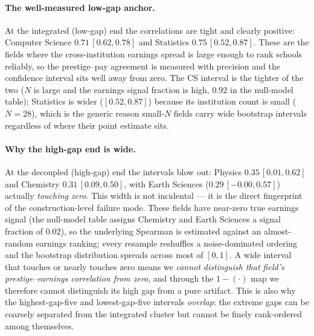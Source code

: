 \documentclass[11pt]{article}
\begin{document}
\paragraph{The well-measured low-gap anchor.}
At the integrated (low-gap) end the correlations are tight and clearly positive: Computer Science $\mathbf{0.71\,[0.62,0.78]}$ and Statistics $\mathbf{0.75\,[0.52,0.87]}$. These are the fields where the cross-institution earnings spread is large enough to rank schools reliably, so the prestige--pay agreement is measured with precision and the confidence interval sits well away from zero. The CS interval is the tighter of the two ($N$ is large and the earnings signal fraction is high, $0.92$ in the null-model table); Statistics is wider ($[0.52,0.87]$) because its institution count is small ($N=28$), which is the generic reason small-$N$ fields carry wide bootstrap intervals regardless of where their point estimate sits.

\paragraph{Why the high-gap end is wide.}
At the decoupled (high-gap) end the intervals blow out: Physics $\mathbf{0.35\,[0.01,0.62]}$ and Chemistry $\mathbf{0.31\,[0.09,0.50]}$, with Earth Sciences ($0.29\,[-0.00,0.57]$) actually \emph{touching zero}. This width is not incidental --- it is the direct fingerprint of the construction-level failure mode. These fields have near-zero true earnings signal (the null-model table assigns Chemistry and Earth Sciences a signal fraction of $0.02$), so the underlying Spearman is estimated against an almost-random earnings ranking; every resample reshuffles a noise-dominated ordering and the bootstrap distribution spreads across most of $[0,1]$. A wide interval that touches or nearly touches zero means we \emph{cannot distinguish that field's prestige--earnings correlation from zero}, and through the $1-(\cdot)$ map we therefore cannot distinguish its high gap from a pure artifact. This is also why the highest-gap-five and lowest-gap-five intervals \emph{overlap}: the extreme gaps can be coarsely separated from the integrated cluster but cannot be finely rank-ordered among themselves.
\end{document}
